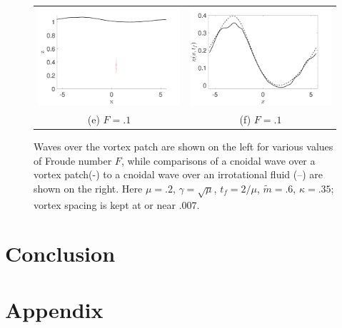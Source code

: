 \documentclass[a4paper,11pt]{article}
\begin{document}
\begin{figure}
\begin{tabular}{cc}
\includegraphics[width=.45\textwidth]{wave_over_vortices_m_pt6_w0_10} & \includegraphics[width=.45\textwidth]{profiles_m_pt6_w0_10}\\
(e)  $F=.1$ & (f)  $F=.1$
\end{tabular}
\caption{Waves over the vortex patch are shown on the left for various values of Froude number $F$, while comparisons of a cnoidal wave over a vortex patch(-) to a cnoidal wave over an irrotational fluid (--) are shown on the right.  Here $\mu=.2$, $\gamma=\sqrt{\mu}$, $t_{f}=2/\mu$, $\tilde{m}=.6$, $\kappa = .35$; vortex spacing is kept at or near $.007$.}
\label{fig:midsolwave}
\end{figure}

\section*{Conclusion}
\section*{Appendix}


\end{document}
